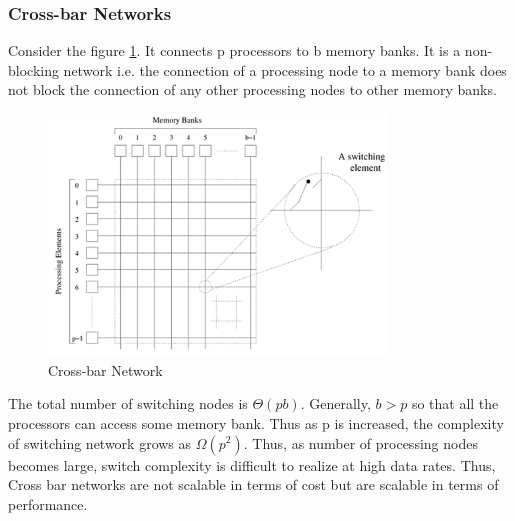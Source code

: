 \documentclass[12pt]{article}
\begin{document}
\subsubsection{Cross-bar Networks}
Consider the figure \ref{fig:crossbar}. It connects p processors to b memory banks.
It is a non-blocking network i.e. the connection of a processing node to a memory bank does not block the connection
of any other processing nodes to other memory banks. 
\begin{figure}[H]
    \centering
    \includegraphics[width=0.8\textwidth]{images/crossbar.png}
    \caption{Cross-bar Network}
    \label{fig:crossbar}
\end{figure}
The total number of switching nodes is $\Theta(pb)$. Generally, $b>p$ so that 
all the processors can access some memory bank. Thus as p is increased, the complexity of switching network 
grows as $\Omega(p^2)$. Thus, as number of processing nodes becomes large, switch complexity is difficult to realize
at high data rates. Thus, Cross bar networks are not scalable in terms of cost but are scalable in terms of performance.
\end{document}
